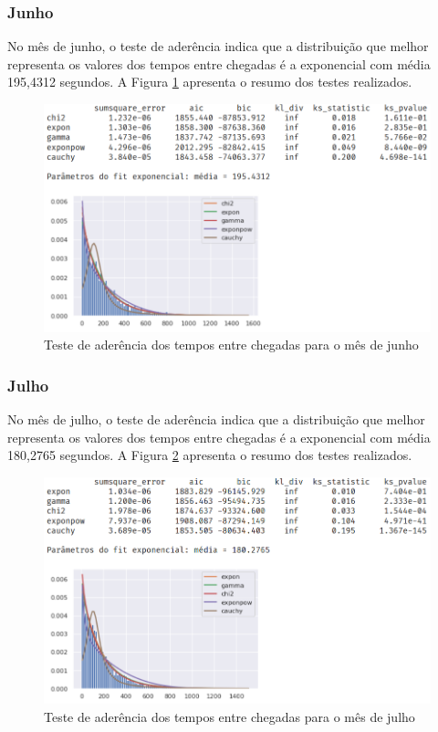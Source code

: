 \subsubsection*{Junho}
No mês de junho, o teste de aderência indica que a distribuição que melhor representa os valores dos tempos entre chegadas é a exponencial com média 195,4312 segundos. A Figura \ref*{fig: fit-junho} apresenta o resumo dos testes realizados.

\begin{figure}[H]
    \includegraphics[scale=0.8]{analise-de-dados/fit/fit-junho.png}
    \caption{Teste de aderência dos tempos entre chegadas para o mês de junho}
    \label{fig: fit-junho}
\end{figure}

\subsubsection*{Julho}
No mês de julho, o teste de aderência indica que a distribuição que melhor representa os valores dos tempos entre chegadas é a exponencial com média 180,2765 segundos. A Figura \ref*{fig: fit-julho} apresenta o resumo dos testes realizados.

\begin{figure}[H]
    \includegraphics[scale=0.8]{analise-de-dados/fit/fit-julho.png}
    \caption{Teste de aderência dos tempos entre chegadas para o mês de julho}
    \label{fig: fit-julho}
\end{figure}

